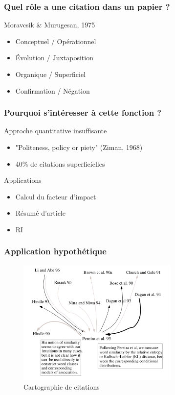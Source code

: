 \documentclass[10pt]{beamer}
\begin{document}
\begin{frame}
  \frametitle{Quel rôle a une citation dans un papier ?}

  \begin{block}{Moravcsik \& Murugesan, 1975}
  \begin{itemize}
    \item Conceptuel / Opérationnel
    \item Évolution / Juxtaposition
    \item Organique / Superficiel
    \item Confirmation / Négation
  \end{itemize}
  \end{block}
\end{frame}

\begin{frame}
  \frametitle{Pourquoi s'intéresser à cette fonction ?}
  
  \begin{block}{Approche quantitative insuffisante}
  \begin{itemize}
    \item "Politeness, policy or piety" (Ziman, 1968)
    \item 40\% de citations superficielles
  \end{itemize}
  \end{block}
  
  \begin{block}{Applications}
  \begin{itemize}
    \item Calcul du facteur d'impact
    \item Résumé d'article
    \item RI
  \end{itemize}
  \end{block}
\end{frame}

\begin{frame}
  \frametitle{Application hypothétique}
\begin{figure}[ht!]
\centering
\includegraphics[width=80mm]{citation_map.png}
\caption{Cartographie de citations}
\label{overflow}
\end{figure}

\end{frame}
\end{document}
